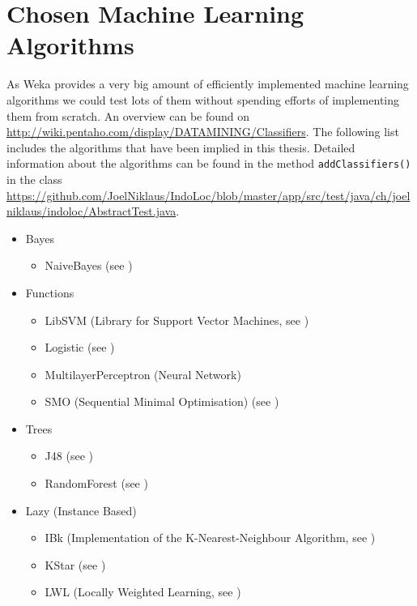 \section{Chosen Machine Learning Algorithms}
As Weka provides a very big amount of efficiently implemented machine learning algorithms we could test lots of them without spending efforts of implementing them from scratch. An overview can be found on \url{http://wiki.pentaho.com/display/DATAMINING/Classifiers}. The following list includes the algorithms that have been implied in this thesis. Detailed information about the algorithms can be found in the method \texttt{addClassifiers()} in the class \url{https://github.com/JoelNiklaus/IndoLoc/blob/master/app/src/test/java/ch/joelniklaus/indoloc/AbstractTest.java}.

\begin{itemize}
   \item Bayes
   \begin{itemize}
     \item NaiveBayes (see \cite{John1995})
   \end{itemize}
   
   \item Functions
   \begin{itemize}
     \item LibSVM (Library for Support Vector Machines, see \cite{libsvm})
     \item Logistic (see \cite{leCessie1992})
     \item MultilayerPerceptron (Neural Network)
     \item SMO (Sequential Minimal Optimisation) (see \cite{Platt1998, Keerthi2001, Hastie1998})
   \end{itemize}
   
   \item Trees
   \begin{itemize}
     \item J48 (see \cite{Quinlan1993})
     \item RandomForest (see \cite{Breiman2001})
   \end{itemize}
   
   \item Lazy (Instance Based)
   \begin{itemize}
     \item IBk (Implementation of the K-Nearest-Neighbour Algorithm, see \cite{Aha1991})
     \item KStar (see \cite{Cleary1995})
     \item LWL (Locally Weighted Learning, see \cite{Frank2003, Atkeson1996})
   \end{itemize}
   

\end{itemize}

